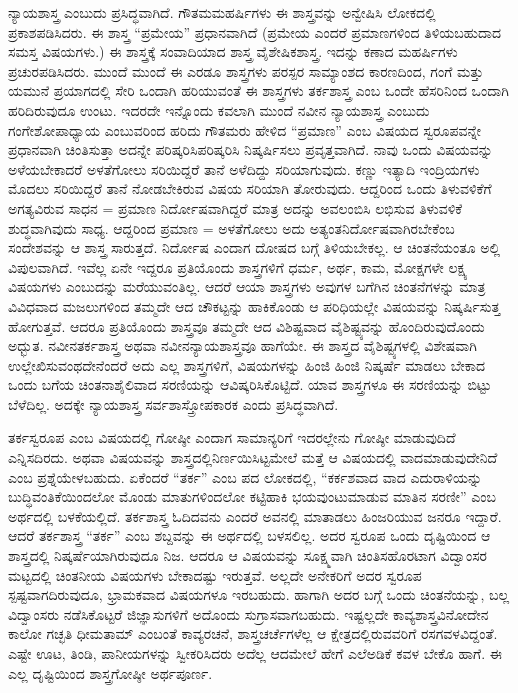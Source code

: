 {ನ್ಯಾಯಶಾಸ್ತ್ರ ಎಂಬುದು ಪ್ರಸಿದ್ಧವಾಗಿದೆ. ಗೌತಮಮಹರ್ಷಿಗಳು ಈ ಶಾಸ್ತ್ರವನ್ನು ಅನ್ವೇಷಿಸಿ ಲೋಕದಲ್ಲಿ ಪ್ರಕಾಶಪಡಿಸಿದರು. ಈ ಶಾಸ್ತ್ರ “ಪ್ರಮೇಯ” ಪ್ರಧಾನವಾಗಿದೆ \enginline{-} (ಪ್ರಮೇಯ ಎಂದರೆ ಪ್ರಮಾಣಗಳಿಂದ ತಿಳಿಯಬಹುದಾದ ಸಮಸ್ತ ವಿಷಯಗಳು.) ಈ  ಶಾಸ್ತ್ರಕ್ಕೆ ಸಂವಾದಿಯಾದ ಶಾಸ್ತ್ರ ವೈಶೇಷಿಕಶಾಸ್ತ್ರ. ಇದನ್ನು ಕಣಾದ ಮಹರ್ಷಿಗಳು ಪ್ರಚುರಪಡಿಸಿದರು. ಮುಂದೆ ಮುಂದೆ ಈ ಎರಡೂ ಶಾಸ್ತ್ರಗಳು ಪರಸ್ಪರ ಸಾಮ್ಯಾಂಶದ ಕಾರಣದಿಂದ, ಗಂಗೆ ಮತ್ತು ಯಮುನೆ ಪ್ರಯಾಗದಲ್ಲಿ ಸೇರಿ ಒಂದಾಗಿ ಹರಿಯುವಂತೆ  ಈ ಶಾಸ್ತ್ರಗಳು ತರ್ಕಶಾಸ್ತ್ರ ಎಂಬ ಒಂದೇ ಹೆಸರಿನಿಂದ ಒಂದಾಗಿ ಹರಿದಿರುವುದೂ ಉಂಟು. ಇದರದೇ ಇನ್ನೊಂದು ಕವಲಾಗಿ ಮುಂದೆ ನವೀನ ನ್ಯಾಯಶಾಸ್ತ್ರ ಎಂಬುದು ಗಂಗೇಶೋಪಾಧ್ಯಾಯ ಎಂಬುವರಿಂದ ಹರಿದು ಗೌತಮರು ಹೇಳಿದ “ಪ್ರಮಾಣ” ಎಂಬ ವಿಷಯದ ಸ್ವರೂಪವನ್ನೇ ಪ್ರಧಾನವಾಗಿ ಚಿಂತಿಸುತ್ತಾ ಅದನ್ನೇ ಪರಿಷ್ಕರಿಸಿ\break ಪರಿಷ್ಕರಿಸಿ ನಿಷ್ಕರ್ಷಿಸಲು ಪ್ರವೃತ್ತವಾಗಿದೆ. ನಾವು ಒಂದು ವಿಷಯವನ್ನು ಅಳೆಯ\-ಬೇಕಾದರೆ ಅಳತೆಗೋಲು ಸರಿಯಿದ್ದರೆ ತಾನೆ ಅಳೆದಿದ್ದು ಸರಿಯಾಗುವುದು. ಕಣ್ಣು ಇತ್ಯಾದಿ ಇಂದ್ರಿಯಗಳು ಮೊದಲು ಸರಿಯಿದ್ದರೆ ತಾನೆ ನೋಡಬೇಕಿರುವ ವಿಷಯ ಸರಿಯಾಗಿ ತೋರುವುದು. ಆದ್ದರಿಂದ ಒಂದು ತಿಳುವಳಿಕೆಗೆ ಅಗತ್ಯವಿರುವ ಸಾಧನ = ಪ್ರಮಾಣ ನಿರ್ದೋಷವಾಗಿದ್ದರೆ ಮಾತ್ರ ಅದನ್ನು ಅವಲಂಬಿಸಿ ಲಭಿಸುವ ತಿಳುವಳಿಕೆ ಶುದ್ಧವಾಗಿವುದು ಸಾಧ್ಯ. ಆದ್ದರಿಂದ ಪ್ರಮಾಣ = ಅಳತೆಗೋಲು ಅದು ಅತ್ಯಂತ\break ನಿರ್ದೋಷವಾಗಿರಬೇಕೆಂಬ ಸಂದೇಶವನ್ನು ಆ ಶಾಸ್ತ್ರ ಸಾರುತ್ತದೆ. ನಿರ್ದೋಷ ಎಂದಾಗ ದೋಷದ ಬಗ್ಗೆ ತಿಳಿಯಬೇಕಲ್ಲ. ಆ ಚಿಂತನೆಯಂತೂ ಅಲ್ಲಿ ವಿಪುಲವಾಗಿದೆ. ಇವೆಲ್ಲ ಏನೇ ಇದ್ದರೂ ಪ್ರತಿಯೊಂದು ಶಾಸ್ತ್ರಗಳಿಗೆ ಧರ್ಮ, ಅರ್ಥ, ಕಾಮ, ಮೋಕ್ಷಗಳೇ ಲಕ್ಷ್ಯ ವಿಷಯಗಳು ಎಂಬುದನ್ನು ಮರೆಯುವಂತಿಲ್ಲ. ಆದರೆ ಆಯಾ ಶಾಸ್ತ್ರಗಳು ಅವುಗಳ ಬಗೆಗಿನ ಚಿಂತನೆಗಳನ್ನು ಮಾತ್ರ ವಿವಿಧವಾದ ಮಜಲುಗಳಿಂದ ತಮ್ಮದೇ ಆದ ಚೌಕಟ್ಟನ್ನು ಹಾಕಿಕೊಂಡು ಆ ಪರಿಧಿಯಲ್ಲೇ ವಿಷಯವನ್ನು ನಿಷ್ಕರ್ಷಿಸುತ್ತ ಹೋಗುತ್ತವೆ. ಆದರೂ ಪ್ರತಿಯೊಂದು ಶಾಸ್ತ್ರವೂ ತಮ್ಮದೇ ಆದ ವಿಶಿಷ್ಟವಾದ ವೈಶಿಷ್ಟ್ಯವನ್ನು ಹೊಂದಿರುವುದೊಂದು ಅಧ್ಭುತ. ನವೀನತರ್ಕಶಾಸ್ತ್ರ ಅಥವಾ ನವೀನನ್ಯಾಯಶಾಸ್ತ್ರವೂ ಹಾಗೆಯೇ. ಈ ಶಾಸ್ತ್ರದ ವೈಶಿಷ್ಟ್ಯಗಳಲ್ಲಿ ವಿಶೇಷವಾಗಿ ಉಲ್ಲೇಖಿಸುವಂಥದೇನೆಂದರೆ ಅದು ಎಲ್ಲ ಶಾಸ್ತ್ರಗಳಿಗೆ, ವಿಷಯಗಳನ್ನು ಹಿಂಜಿ ಹಿಂಜಿ ನಿಷ್ಕರ್ಷೆ ಮಾಡಲು ಬೇಕಾದ ಒಂದು ಬಗೆಯ ಚಿಂತನಾಶೈಲಿ\enginline{-}ವಾದ ಸರಣಿಯನ್ನು ಆವಿಷ್ಕರಿಸಿಕೊಟ್ಟಿದೆ. ಯಾವ ಶಾಸ್ತ್ರಗಳೂ ಈ ಸರಣಿಯನ್ನು ಬಿಟ್ಟು ಬೆಳೆದಿಲ್ಲ. ಅದಕ್ಕೇ ನ್ಯಾಯಶಾಸ್ತ್ರ ಸರ್ವಶಾಸ್ತ್ರೋಪಕಾರಕ ಎಂದು ಪ್ರಸಿದ್ಧವಾಗಿದೆ. 

ತರ್ಕಸ್ವರೂಪ ಎಂಬ ವಿಷಯದಲ್ಲಿ ಗೋಷ್ಠೀ ಎಂದಾಗ ಸಾಮಾನ್ಯರಿಗೆ ಇದರಲ್ಲೇನು ಗೋಷ್ಠೀ ಮಾಡುವುದಿದೆ ಎನ್ನಿಸದಿರದು. ಅಥವಾ ವಿಷಯವನ್ನು ಶಾಸ್ತ್ರದಲ್ಲಿ\break ನಿರ್ಣಯಿಸಿಟ್ಟಮೇಲೆ ಮತ್ತೆ ಆ ವಿಷಯದಲ್ಲಿ ವಾದಮಾಡುವುದೇನಿದೆ ಎಂಬ ಪ್ರಶ್ನೆಯೇಳಬಹುದು. ಏಕೆಂದರೆ  “ತರ್ಕ” ಎಂಬ ಪದ ಲೋಕದಲ್ಲಿ, “ಕರ್ಕಶವಾದ ವಾದ \enginline{-} ಎದುರಾಳಿಯನ್ನು ಬುದ್ಧಿವಂತಿಕೆಯಿಂದಲೋ ಮೊಂಡು ಮಾತುಗಳಿಂದಲೋ ಕಟ್ಟಿಹಾಕಿ  ಭಯವುಂಟುಮಾಡುವ ಮಾತಿನ ಸರಣೀ” ಎಂಬ ಅರ್ಥದಲ್ಲಿ ಬಳಕೆಯಲ್ಲಿದೆ. ತರ್ಕಶಾಸ್ತ್ರ ಓದಿದವನು ಎಂದರೆ ಅವನಲ್ಲಿ ಮಾತಾಡಲು ಹಿಂಜರಿಯುವ ಜನರೂ ಇದ್ದಾರೆ. ಆದರೆ ತರ್ಕಶಾಸ್ತ್ರ “ತರ್ಕ” ಎಂಬ ಶಬ್ದವನ್ನು ಈ ಅರ್ಥದಲ್ಲಿ ಬಳಸಲಿಲ್ಲ. ಅದರ ಸ್ವರೂಪ ಒಂದು ದೃಷ್ಟಿಯಿಂದ ಆ ಶಾಸ್ತ್ರದಲ್ಲಿ ನಿಷ್ಕರ್ಷೆಯಾಗಿರುವುದೂ ನಿಜ. ಆದರೂ ಆ ವಿಷಯವನ್ನು ಸೂಕ್ಷ್ಮವಾಗಿ ಚಿಂತಿಸಹೊರಟಾಗ ವಿದ್ವಾಂಸರ ಮಟ್ಟದಲ್ಲಿ ಚಿಂತನೀಯ ವಿಷಯಗಳು ಬೇಕಾದಷ್ಟು ಇರುತ್ತವೆ. ಅಲ್ಲದೇ ಅನೇಕರಿಗೆ ಅದರ ಸ್ವರೂಪ ಸ್ಪಷ್ಟವಾಗ\-ದಿರುವುದೂ, ಭ್ರಾಮಕವಾದ ವಿಷಯಗಳೂ ಇರಬಹುದು. ಹಾಗಾಗಿ ಅದರ ಬಗ್ಗೆ ಒಂದು ಚಿಂತನೆಯನ್ನು, ಬಲ್ಲ ವಿದ್ವಾಂಸರು ನಡೆಸಿಕೊಟ್ಟರೆ ಜಿಜ್ಞಾಸುಗಳಿಗೆ ಅದೊಂದು ಸುಗ್ರಾಸವಾಗಬಹುದು. ಇಷ್ಟಲ್ಲದೇ ಕಾವ್ಯಶಾಸ್ತ್ರವಿನೋದೇನ ಕಾಲೋ ಗಚ್ಛತಿ ಧೀಮತಾಮ್ ಎಂಬಂತೆ ಕಾವ್ಯರಚನೆ, ಶಾಸ್ತ್ರಚರ್ಚೆಗಳೆಲ್ಲ ಆ ಕ್ಷೇತ್ರದಲ್ಲಿರುವವರಿಗೆ ರಸಗವಳವಿದ್ದಂತೆ. ಎಷ್ಟೇ ಊಟ, ತಿಂಡಿ, ಪಾನೀಯಗಳನ್ನು ಸ್ವೀಕರಿಸಿದರು ಅದೆಲ್ಲ ಆದಮೇಲೆ ಹೇಗೆ ಎಲೆ\enginline{-}ಅಡಿಕೆ ಕವಳ ಬೇಕೊ ಹಾಗೆ. ಈ ಎಲ್ಲ ದೃಷ್ಟಿಯಿಂದ ಶಾಸ್ತ್ರಗೋಷ್ಠೀ ಅರ್ಥಪೂರ್ಣ.  

}
